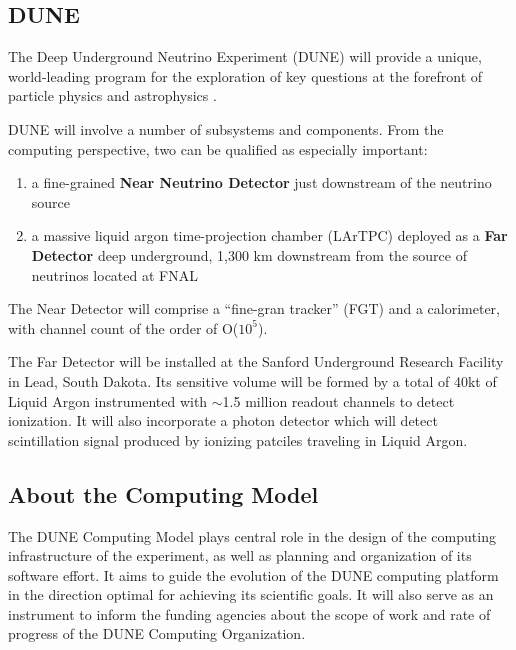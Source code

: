 \subsection{DUNE}

The Deep Underground Neutrino Experiment (DUNE) will provide a unique, world-leading program
for the exploration of key questions at the forefront of particle physics and astrophysics .

DUNE will involve a number of subsystems and components. From the computing
perspective, two can be qualified as especially important:

\begin{enumerate}

\item a fine-grained \textbf{Near Neutrino Detector} just downstream of the neutrino source
\item a massive liquid argon time-projection chamber (LArTPC) deployed as a \textbf{Far
Detector} deep underground, 1,300 km downstream from the source of neutrinos located at FNAL

\end{enumerate}

The Near Detector will comprise a ``fine-gran tracker'' (FGT) and a calorimeter, with channel count of the order of O($10^{5}$).

The Far Detector will be installed at the Sanford Underground Research Facility in Lead, South Dakota.
Its sensitive volume will be formed by a total of 40kt of Liquid Argon instrumented with $\sim$1.5 million readout
channels to detect ionization. It will also incorporate a photon detector which will detect scintillation
signal produced by ionizing patciles traveling in Liquid Argon.



\subsection{About the Computing Model}
\label{sec:modelrole}

The DUNE Computing Model plays central role in the design of the computing infrastructure of the experiment, as well as
planning and organization of its software effort. It aims to guide the evolution of the DUNE computing platform in the direction
optimal for achieving its scientific goals. It will also serve
as an instrument to inform the funding agencies about the scope of work and rate of progress of the DUNE  
Computing Organization.

